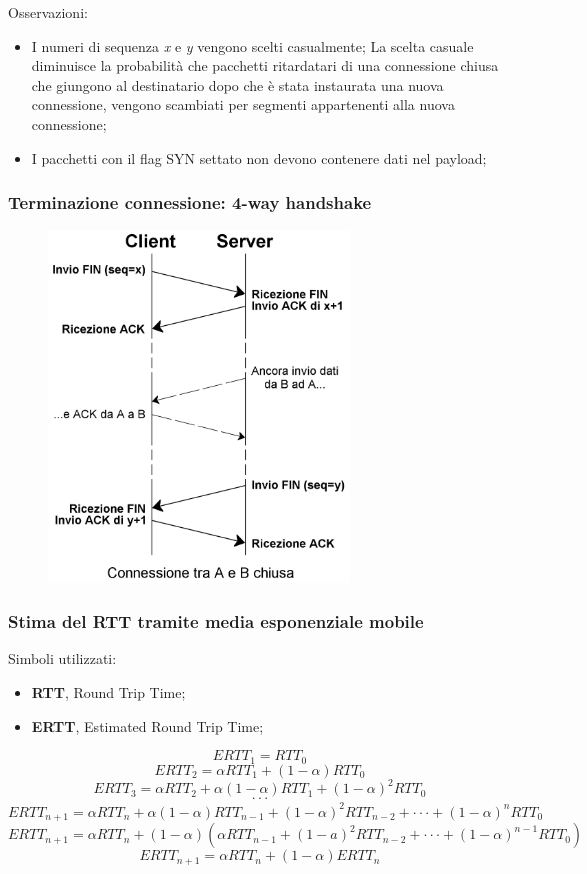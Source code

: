 \documentclass[12pt,a4paper]{article}
\begin{document}
Osservazioni:
\begin{itemize}
  \item I numeri di sequenza \emph{x} e \emph{y} vengono scelti casualmente;
    La scelta casuale diminuisce la probabilità che pacchetti ritardatari
    di una connessione chiusa che giungono al destinatario dopo che è stata
    instaurata una nuova connessione, vengono scambiati per segmenti appartenenti
    alla nuova connessione;
  \item I pacchetti con il flag SYN settato non devono contenere dati nel payload;
\end{itemize}

\subsubsection{Terminazione connessione: 4-way handshake}
\begin{figure}[H]
\centering
\includegraphics[width=8cm]{img/4/tcp-4way-hs.png}
\end{figure}

\subsubsection{Stima del RTT tramite media esponenziale mobile}
Simboli utilizzati:
\begin{itemize}
  \item \textbf{RTT}, Round Trip Time;
  \item \textbf{ERTT}, Estimated Round Trip Time;
\end{itemize}

$$ ERTT_1 = RTT_0 $$
$$ ERTT_2 = \alpha RTT_1 + (1 - \alpha) RTT_0 $$
$$ ERTT_3 = \alpha RTT_2 + \alpha(1 - \alpha) RTT_1 + (1 - \alpha)^2 RTT_0 $$
$$ \cdot \cdot \cdot  $$
$$ ERTT_{n + 1} = \alpha RTT_n + \alpha(1 - \alpha) RTT_{n - 1} + (1 - \alpha)^2 RTT_{n - 2} + \cdot \cdot \cdot + (1 - \alpha)^n RTT_0 $$
$$ ERTT_{n + 1} = \alpha RTT_n + (1 - \alpha) (\alpha RTT_{n - 1} + (1 - a)^{2} RTT_{n - 2} + \cdot \cdot \cdot + (1 - \alpha)^{n - 1} RTT_0) $$
$$ ERTT_{n + 1} = \alpha RTT_n + (1 - \alpha) ERTT_{n} $$

\clearpage
\printbibliography[heading=bibintoc]
\end{document}
